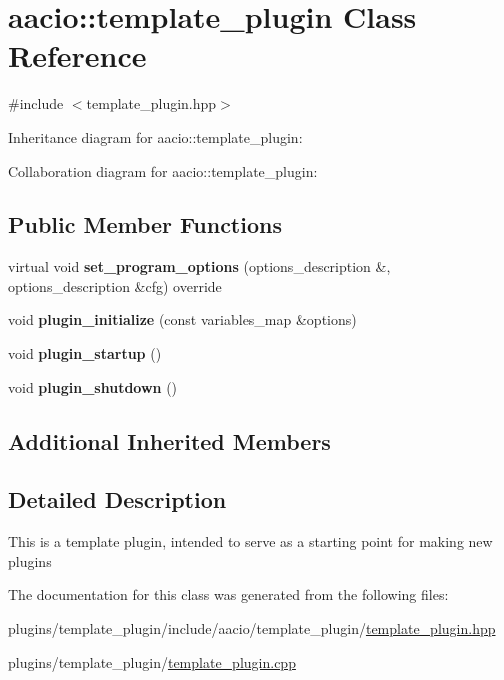 \hypertarget{classaacio_1_1template__plugin}{}\section{aacio\+:\+:template\+\_\+plugin Class Reference}
\label{classaacio_1_1template__plugin}


{\ttfamily \#include $<$template\+\_\+plugin.\+hpp$>$}



Inheritance diagram for aacio\+:\+:template\+\_\+plugin\+:


Collaboration diagram for aacio\+:\+:template\+\_\+plugin\+:
\subsection*{Public Member Functions}
\begin{DoxyCompactItemize}
\item 
\mbox{\label{classaacio_1_1template__plugin_a5e79dc2ad37b3c9e0dd6ae8383809d81}} 
virtual void {\bfseries set\+\_\+program\+\_\+options} (options\+\_\+description \&, options\+\_\+description \&cfg) override
\item 
\mbox{\label{classaacio_1_1template__plugin_a890b99c7b14022d022eda6a9c732e2fc}} 
void {\bfseries plugin\+\_\+initialize} (const variables\+\_\+map \&options)
\item 
\mbox{\label{classaacio_1_1template__plugin_a0c5734bbdde9efd054c48577bc620841}} 
void {\bfseries plugin\+\_\+startup} ()
\item 
\mbox{\label{classaacio_1_1template__plugin_a3822af362fa7304343fe06a949010cd5}} 
void {\bfseries plugin\+\_\+shutdown} ()
\end{DoxyCompactItemize}
\subsection*{Additional Inherited Members}


\subsection{Detailed Description}
This is a template plugin, intended to serve as a starting point for making new plugins 

The documentation for this class was generated from the following files\+:\begin{DoxyCompactItemize}
\item 
plugins/template\+\_\+plugin/include/aacio/template\+\_\+plugin/\mbox{\hyperlink{template__plugin_8hpp}{template\+\_\+plugin.\+hpp}}\item 
plugins/template\+\_\+plugin/\mbox{\hyperlink{template__plugin_8cpp}{template\+\_\+plugin.\+cpp}}\end{DoxyCompactItemize}
